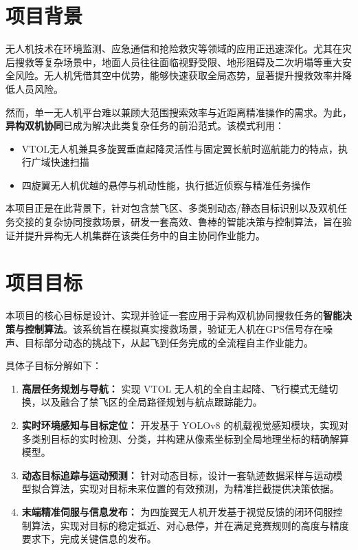\documentclass[12pt]{article}
\begin{document}
\section{项目背景}
无人机技术在环境监测、应急通信和抢险救灾等领域的应用正迅速深化。尤其在灾后搜救等复杂场景中，地面人员往往面临视野受限、地形阻碍及二次坍塌等重大安全风险。无人机凭借其空中优势，能够快速获取全局态势，显著提升搜救效率并降低人员风险。

然而，单一无人机平台难以兼顾大范围搜索效率与近距离精准操作的需求。为此，\textbf{异构双机协同}已成为解决此类复杂任务的前沿范式。该模式利用：
\begin{itemize}
    \item VTOL无人机兼具多旋翼垂直起降灵活性与固定翼长航时巡航能力的特点，执行广域快速扫描
    \item 四旋翼无人机优越的悬停与机动性能，执行抵近侦察与精准任务操作
\end{itemize}

本项目正是在此背景下，针对包含禁飞区、多类别动态/静态目标识别以及双机任务交接的复杂协同搜救场景，研发一套高效、鲁棒的智能决策与控制算法，旨在验证并提升异构无人机集群在该类任务中的自主协同作业能力。

\section{项目目标}
本项目的核心目标是设计、实现并验证一套应用于异构双机协同搜救任务的\textbf{智能决策与控制算法}。该系统旨在模拟真实搜救场景，验证无人机在GPS信号存在噪声、目标部分动态的挑战下，从起飞到任务完成的全流程自主作业能力。

具体子目标分解如下：
\begin{enumerate}
    \item \textbf{高层任务规划与导航：} 实现 VTOL 无人机的全自主起降、飞行模式无缝切换，以及融合了禁飞区的全局路径规划与航点跟踪能力。
    \item \textbf{实时环境感知与目标定位：} 开发基于 YOLOv8 的机载视觉感知模块，实现对多类别目标的实时检测、分类，并构建从像素坐标到全局地理坐标的精确解算模型。
    \item \textbf{动态目标追踪与运动预测：} 针对动态目标，设计一套轨迹数据采样与运动模型拟合算法，实现对目标未来位置的有效预测，为精准拦截提供决策依据。
    \item \textbf{末端精准伺服与信息发布：} 为四旋翼无人机开发基于视觉反馈的闭环伺服控制算法，实现对目标的稳定抵近、对心悬停，并在满足竞赛规则的高度与精度要求下，完成关键信息的发布。
\end{enumerate}
\end{document}
